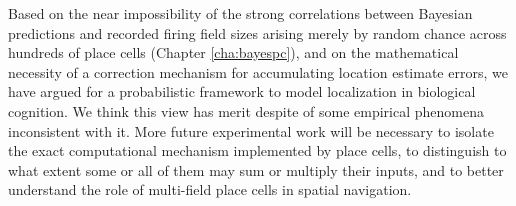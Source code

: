 Based on the near impossibility of the strong correlations between Bayesian predictions and recorded firing field sizes arising merely by random chance across hundreds of place cells (Chapter \ref{cha:bayespc}), and on the mathematical necessity of a correction mechanism for accumulating location estimate errors, we have argued for a probabilistic framework to model localization in biological cognition. We think this view has merit despite of some empirical phenomena inconsistent with it. More future experimental work will be necessary to isolate the exact computational mechanism implemented by place cells, to distinguish to what extent some or all of them may sum or multiply their inputs, and to better understand the role of multi-field place cells in spatial navigation. 



















